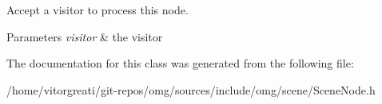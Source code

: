 Accept a visitor to process this node. 


\begin{DoxyParams}{Parameters}
{\em visitor} & the visitor \\
\hline
\end{DoxyParams}


The documentation for this class was generated from the following file\+:\begin{DoxyCompactItemize}
\item 
/home/vitorgreati/git-\/repos/omg/sources/include/omg/scene/Scene\+Node.\+h\end{DoxyCompactItemize}
